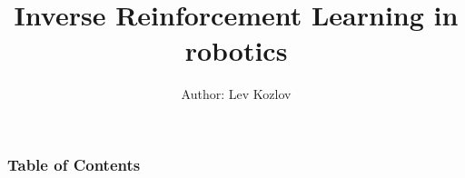 \documentclass[
    11pt, %
    aspectratio=169, %
]{beamer}
\title[]{Inverse Reinforcement Learning in robotics}
\subtitle{}
\author[]{Author: Lev Kozlov}
\institute[]{Robotics Track \\ \smallskip \textit{l.kozlov@innopolis.university}}
\date[Fall 2023]
\begin{document}
\section{}
\begin{frame}
    \titlepage %

\end{frame}


\begin{frame}
    \frametitle{Table of Contents} %

    \tableofcontents %
\end{frame}











\end{document}

